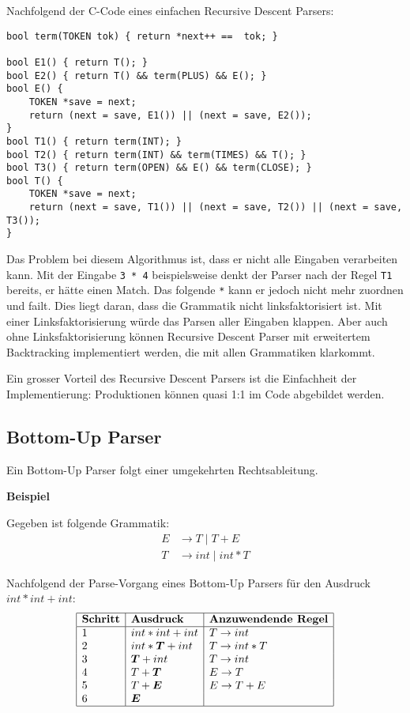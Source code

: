 Nachfolgend der C-Code eines einfachen Recursive Descent Parsers:

\begin{verbatim}
bool term(TOKEN tok) { return *next++ ==  tok; }

bool E1() { return T(); }
bool E2() { return T() && term(PLUS) && E(); }
bool E() {
    TOKEN *save = next;
    return (next = save, E1()) || (next = save, E2());
}
bool T1() { return term(INT); }
bool T2() { return term(INT) && term(TIMES) && T(); }
bool T3() { return term(OPEN) && E() && term(CLOSE); }
bool T() {
    TOKEN *save = next;
    return (next = save, T1()) || (next = save, T2()) || (next = save, T3());
}
\end{verbatim}

Das Problem bei diesem Algorithmus ist, dass er nicht alle Eingaben verarbeiten
kann. Mit der Eingabe \texttt{3 * 4} beispielsweise denkt der Parser nach der
Regel \texttt{T1} bereits, er hätte einen Match. Das folgende \texttt{*} kann er
jedoch nicht mehr zuordnen und failt. Dies liegt daran, dass die Grammatik nicht
linksfaktorisiert ist. Mit einer Linksfaktorisierung würde das Parsen aller
Eingaben klappen. Aber auch ohne Linksfaktorisierung können Recursive Descent
Parser mit erweitertem Backtracking implementiert werden, die mit allen
Grammatiken klarkommt.

Ein grosser Vorteil des Recursive Descent Parsers ist die Einfachheit der
Implementierung: Produktionen können quasi 1:1 im Code abgebildet werden.


\subsection{Bottom-Up Parser} 

Ein Bottom-Up Parser folgt einer umgekehrten Rechtsableitung.

\textbf{Beispiel}

Gegeben ist folgende Grammatik:
%
\begin{align*}
	E &\rightarrow T \mid T + E \\
	T &\rightarrow int \mid int * T
\end{align*}

Nachfolgend der Parse-Vorgang eines Bottom-Up Parsers für den Ausdruck $int * int + int$:
\[
	\begin{array}{|l|l|l|}
		\hline
		\textbf{Schritt} & \textbf{Ausdruck} & \textbf{Anzuwendende Regel} \\
		\hline
		1 & int * int + int & T \rightarrow int \\
		2 & int * \boldsymbol T + int & T \rightarrow int * T \\
		3 & \boldsymbol T + int & T \rightarrow int \\
		4 & T + \boldsymbol T & E \rightarrow T \\
		5 & T + \boldsymbol E & E \rightarrow T + E \\
		6 & \boldsymbol E & \\
		\hline
	\end{array}
\]

